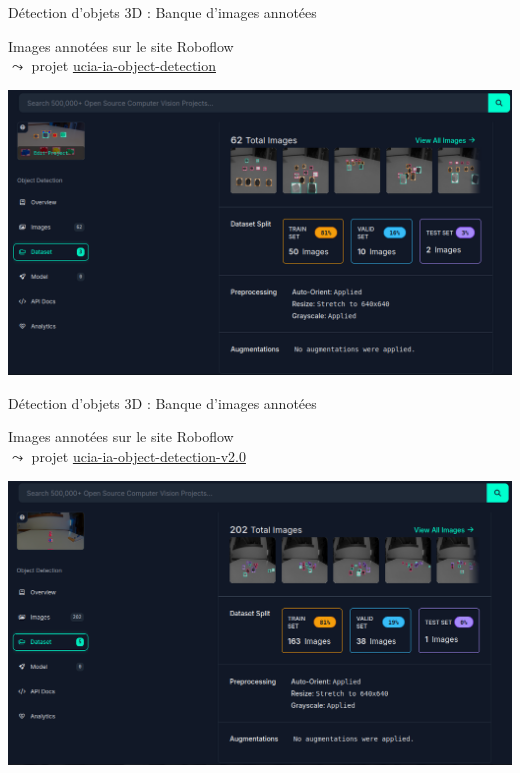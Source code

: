 \documentclass[11pt,serif,mathserif,compress,hyperref={colorlinks}]{beamer}
\begin{document}
\begin{frame}{Détection d'objets 3D : Banque d'images annotées}
  
  \begin{tcolorbox}[title=Annotation des images (v1)]
    {\small Images annotées sur le site Roboflow \\
      $\leadsto$ projet \href{https://universe.roboflow.com/ucia/ucia-ia-object-detection/dataset/4}{ucia-ia-object-detection}
    }
    
     \medskip\includegraphics[width=.9\textwidth]{images/Roboflow_datasets_v1_dark.png}
    
  \end{tcolorbox}

\end{frame}

\begin{frame}{Détection d'objets 3D : Banque d'images annotées}
  
  \begin{tcolorbox}[title=Annotation des images (v2)]
    {\small Images annotées sur le site Roboflow\\
      $\leadsto$ projet \href{https://universe.roboflow.com/ucia/ucia-ia-object-detection-v2.0/dataset/3}{ucia-ia-object-detection-v2.0}
    }
    
     \medskip\includegraphics[width=.9\textwidth]{images/Roboflow_datasets_v2_dark.png}
    
  \end{tcolorbox}

\end{frame}
\end{document}
